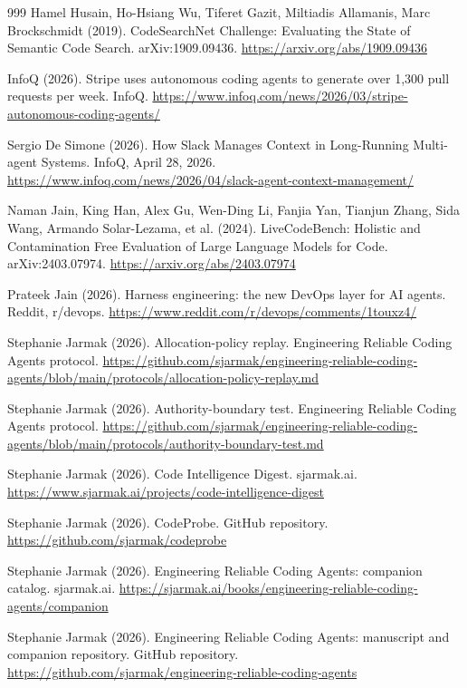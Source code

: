 \begin{thebibliography}{999}
 Hamel Husain, Ho-Hsiang Wu, Tiferet Gazit, Miltiadis Allamanis, Marc Brockschmidt (2019). CodeSearchNet Challenge: Evaluating the State of Semantic Code Search. arXiv:1909.09436. \url{https://arxiv.org/abs/1909.09436}

 InfoQ (2026). Stripe uses autonomous coding agents to generate over 1,300 pull requests per week. InfoQ. \url{https://www.infoq.com/news/2026/03/stripe-autonomous-coding-agents/}

 Sergio De Simone (2026). How Slack Manages Context in Long-Running Multi-agent Systems. InfoQ, April 28, 2026. \url{https://www.infoq.com/news/2026/04/slack-agent-context-management/}

 Naman Jain, King Han, Alex Gu, Wen-Ding Li, Fanjia Yan, Tianjun Zhang, Sida Wang, Armando Solar-Lezama, et al. (2024). LiveCodeBench: Holistic and Contamination Free Evaluation of Large Language Models for Code. arXiv:2403.07974. \url{https://arxiv.org/abs/2403.07974}

 Prateek Jain (2026). Harness engineering: the new DevOps layer for AI agents. Reddit, r/devops. \url{https://www.reddit.com/r/devops/comments/1touxz4/}

 Stephanie Jarmak (2026). Allocation-policy replay. Engineering Reliable Coding Agents protocol. \url{https://github.com/sjarmak/engineering-reliable-coding-agents/blob/main/protocols/allocation-policy-replay.md}

 Stephanie Jarmak (2026). Authority-boundary test. Engineering Reliable Coding Agents protocol. \url{https://github.com/sjarmak/engineering-reliable-coding-agents/blob/main/protocols/authority-boundary-test.md}

 Stephanie Jarmak (2026). Code Intelligence Digest. sjarmak.ai. \url{https://www.sjarmak.ai/projects/code-intelligence-digest}

 Stephanie Jarmak (2026). CodeProbe. GitHub repository. \url{https://github.com/sjarmak/codeprobe}

 Stephanie Jarmak (2026). Engineering Reliable Coding Agents: companion catalog. sjarmak.ai. \url{https://sjarmak.ai/books/engineering-reliable-coding-agents/companion}

 Stephanie Jarmak (2026). Engineering Reliable Coding Agents: manuscript and companion repository. GitHub repository. \url{https://github.com/sjarmak/engineering-reliable-coding-agents}


\end{thebibliography}
